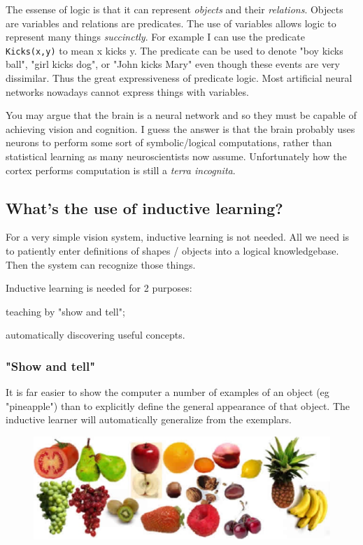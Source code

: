 The essense of logic is that it can represent \emph{objects} and their \emph{relations}. Objects are variables and relations are predicates. The use of variables allows logic to represent many things \emph{succinctly}. For example I can use the predicate \texttt{Kicks(x,y)} to mean x kicks y. The predicate can be used to denote "boy kicks ball", "girl kicks dog", or "John kicks Mary" even though these events are very dissimilar. Thus the great expressiveness of predicate logic. Most artificial neural networks nowadays cannot express things with variables.

You may argue that the brain is a neural network and so they must be capable of achieving vision and cognition. I guess the answer is that the brain probably uses neurons to perform some sort of symbolic/logical computations, rather than statistical learning as many neuroscientists now assume. Unfortunately how the cortex performs computation is still a \emph{terra incognita}.

\subsection{What's the use of inductive learning?}

For a very simple vision system, inductive learning is not needed. All we need is to  patiently enter  definitions of shapes / objects into a logical knowledgebase. Then the system can recognize those things. 

Inductive learning is needed for 2 purposes:
\begin{compactenum}
	\item  teaching by "show and tell";
	\item  automatically discovering useful concepts.
\end{compactenum}

\subsubsection{"Show and tell"}

It is far easier to show the computer a number of examples of an object (eg "pineapple") than to explicitly define the general appearance of that object. The inductive learner will automatically generalize from the exemplars.

\begin{figure}[H]
\centering
\includegraphics[scale=0.7,bb=0 0 628 218]{Fruits.eps}
\end{figure}

